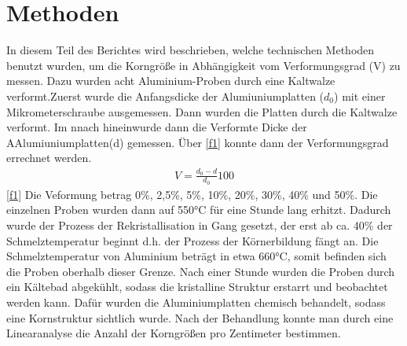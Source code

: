 \documentclass[
	a4paper,
	12pt,
	pagesize,
	ngerman
]{scrartcl}
\begin{document}
\section{Methoden}
In diesem Teil des Berichtes wird beschrieben, welche technischen Methoden benutzt wurden, um die Korngröße in Abhängigkeit vom Verformungsgrad (V) zu messen. Dazu wurden acht Aluminium-Proben durch eine Kaltwalze verformt.Zuerst wurde die Anfangsdicke der Alumiuniumplatten ($d_0$) mit einer Mikrometerschraube ausgemessen. Dann wurden die Platten durch die Kaltwalze verformt. Im nnach hineinwurde dann die Verformte Dicke der AAlumiuniumplatten(d) gemessen. Über \cref{f1} konnte dann der Verformungsgrad errechnet werden.
 \begin{align}
    V = \frac{d_0-d}{d_0}100 \label{f1}
\end{align} \cref{f1}
Die Veformung betrag 0\%, 2,5\%, 5\%, 10\%, 20\%, 30\%, 40\% und 50\%.
Die einzelnen Proben wurden dann auf 550°C für eine Stunde lang erhitzt. Dadurch wurde der Prozess der Rekristallisation in Gang gesetzt, der erst ab ca. 40\% der Schmelztemperatur beginnt d.h. der Prozess der Körnerbildung fängt an. Die Schmelztemperatur von Aluminium beträgt in etwa 660°C, somit befinden sich die Proben oberhalb dieser Grenze. Nach einer Stunde wurden die Proben durch ein Kältebad abgekühlt, sodass die kristalline Struktur erstarrt und beobachtet werden kann. Dafür wurden die Aluminiumplatten chemisch behandelt, sodass eine Kornstruktur sichtlich wurde. Nach der Behandlung konnte man durch eine Linearanalyse die Anzahl der Korngrößen pro Zentimeter bestimmen.
\end{document}
